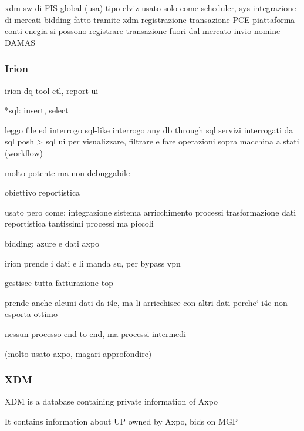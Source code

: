 xdm sw di FIS global (usa)
    tipo elviz
    usato solo come scheduler, sys integrazione di mercati
    bidding fatto tramite xdm
    registrazione transazione PCE
        piattaforma conti enegia
        si possono registrare transazione fuori dal mercato
    invio nomine DAMAS

\subsubsection{Irion}
    irion dq
    tool etl, report ui
    
    
    
    
    *sql: insert, select
    
    leggo file ed interrogo sql-like
    interrogo any db through sql
    servizi interrogati da sql
    posh > sql
    ui per visualizzare, filtrare e fare operazioni sopra
    macchina a stati (workflow)
    
    
    molto potente ma non debuggabile
    
    obiettivo reportistica
    
    usato pero come:
        integrazione sistema
        arricchimento processi
        trasformazione dati
        reportistica
    tantissimi processi ma piccoli
    
    
bidding:
    azure
    e dati axpo
    
    irion prende i dati e li manda su, per bypass vpn
    
    
    gestisce tutta fatturazione top
    
    prende anche alcuni dati da i4c,  ma li arricchisce con altri dati perche` i4c non esporta ottimo
    
    nessun processo end-to-end, ma processi intermedi
    
    
    
    
    
    
    
    
    
    
    
    
    
    
    
    
    (molto usato axpo, magari approfondire)
\subsubsection{XDM}
XDM is a database containing private information of Axpo

It contains information about UP owned by Axpo, bids on MGP
